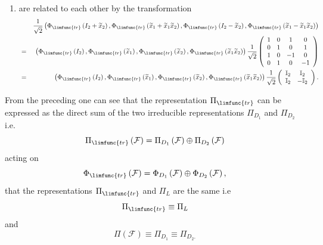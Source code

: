 \documentclass[aps,preprint]{revtex4}
\begin{document}
\begin{enumerate}
\item are related to each other by the transformation 
\begin{eqnarray}
&&\frac{1}{\sqrt{2}}\left( \Phi _{\limfunc{tr}}\left( I_{2}+\widetilde{x}%
_{2}\right) ,\Phi _{\limfunc{tr}}\left( \widetilde{x}_{1}+\widetilde{x}_{1}%
\widetilde{x}_{2}\right) ,\Phi _{\limfunc{tr}}\left( I_{2}-\widetilde{x}%
_{2}\right) ,\Phi _{\limfunc{tr}}\left( \widetilde{x}_{1}-\widetilde{x}_{1}%
\widetilde{x}_{2}\right) \right) \\
&=&\left( \Phi _{\limfunc{tr}}\left( I_{2}\right) ,\Phi _{\limfunc{tr}%
}\left( \widetilde{x}_{1}\right) ,\Phi _{\limfunc{tr}}\left( \widetilde{x}%
_{2}\right) ,\Phi _{\limfunc{tr}}\left( \widetilde{x}_{1}\widetilde{x}%
_{2}\right) \right) \frac{1}{\sqrt{2}}\left( 
\begin{array}{cccc}
1 & 0 & 1 & 0 \\ 
0 & 1 & 0 & 1 \\ 
1 & 0 & -1 & 0 \\ 
0 & 1 & 0 & -1%
\end{array}%
\right) \\
&=&\left( \Phi _{\limfunc{tr}}\left( I_{2}\right) ,\Phi _{\limfunc{tr}%
}\left( \widetilde{x}_{1}\right) ,\Phi _{\limfunc{tr}}\left( \widetilde{x}%
_{2}\right) ,\Phi _{\limfunc{tr}}\left( \widetilde{x}_{1}\widetilde{x}%
_{2}\right) \right) \frac{1}{\sqrt{2}}\left( 
\begin{array}{cc}
\mathbb{I}_{2} & \mathbb{I}_{2} \\ 
\mathbb{I}_{2} & -\mathbb{I}_{2}%
\end{array}%
\right) .
\end{eqnarray}
\end{enumerate}

From the preceding one can see that the representation $\Pi _{\limfunc{tr}}$
can be expressed as the direct sum of the two irreducible representations $%
\Pi _{D_{1}}$ and $\Pi _{D_{2}}$ i.e. 
\begin{equation}
\Pi _{\limfunc{tr}}\left( \mathcal{F}\right) =\Pi _{D_{1}}\left( \mathcal{F}%
\right) \oplus \Pi _{D_{2}}\left( \mathcal{F}\right)
\end{equation}%
acting on 
\begin{equation}
\Phi _{\limfunc{tr}}\left( \mathcal{F}\right) =\Phi _{D_{1}}\left( \mathcal{F%
}\right) \oplus \Phi _{D_{2}}\left( \mathcal{F}\right) ,
\end{equation}%
that the representations $\Pi _{\limfunc{tr}}$ and $\Pi _{L}$ are the same
i.e 
\begin{equation}
\Pi _{\limfunc{tr}}\equiv \Pi _{L}
\end{equation}%
and 
\begin{equation}
\Pi \left( \mathcal{F}\right) \equiv \Pi _{D_{1}}\equiv \Pi _{D_{2}.}
\end{equation}
\end{document}
